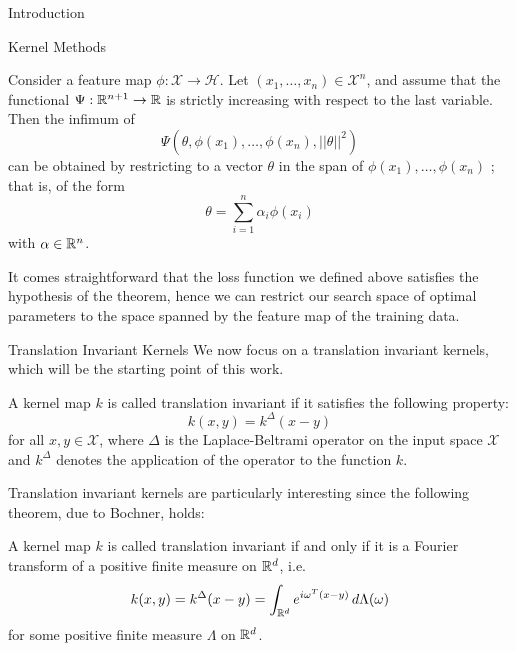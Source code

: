 \begin{chapter}{Introduction}
\begin{section}{Kernel Methods}
  \begin{theorem}
      Consider a feature map $\phi : \mathcal{X} \rightarrow \mathcal{H}$. Let
      $(x_1,\dots,x_n) \in \mathcal{X}^n$, and assume that the functional $\Psi : \mathbb{R}^{n+1} \rightarrow \mathbb{R}$ is strictly increasing
      with respect to the last variable. Then the infimum of
      $$
          \Psi\left(\theta, \phi(x_1), \dots, \phi(x_n), ||\theta||^2\right)
      $$
      can be obtained by restricting to a vector $\theta$ in the span of $\phi(x_1), \dots, \phi(x_n)$ ; that is, of the
      form
      $$
          \theta = \sum_{i=1}^n \alpha_i \phi(x_i)
      $$
      with $\alpha \in \mathbb{R}^n$.
  \end{theorem}
  It comes straightforward that the loss function we defined above satisfies the hypothesis of the theorem, hence
  we can restrict our search space of optimal parameters to the space spanned by the feature map of the training data.
  \vspace{5pt}
  \newline
  \begin{subsection}{Translation Invariant Kernels}
      We now focus on a translation invariant kernels, which will be the starting point of this work.
      \begin{definition}
          A kernel map $k$ is called translation invariant if it satisfies the following property:
          $$k(x,y) = k^{\Delta }(x-y)$$
          for all $x, y \in \mathcal{X}$, where $\Delta$ is the Laplace-Beltrami operator on the input space $\mathcal{X}$ and $k^{\Delta}$ denotes the application of the operator to the function $k$.
      \end{definition}
      Translation invariant kernels are particularly interesting since the following theorem, due to Bochner, holds:

      \begin{theorem}
          A kernel map $k$ is called translation invariant if and only if it is a Fourier transform of a positive finite measure on $\mathbb{R}^d$, i.e.
          $$k(x, y) = k^\Delta(x-y) = \int_{\mathbb{R}^d} e^{i \omega^T (x-y)} \, d \Lambda(\omega)$$
          for some positive finite measure $\Lambda$ on $\mathbb{R}^d$.
      \end{theorem}


\end{subsection}
\end{section}
\end{chapter}
